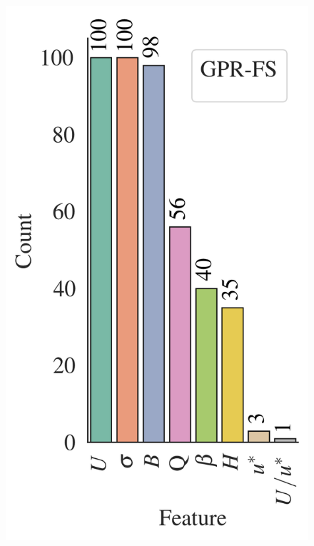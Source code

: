 \documentclass[a4paper,12pt, english]{article}
\begin{document}
\begin{figure}[!htb]
    \centering 
    \includegraphics[height=0.35\textheight]{./results/eml____300dpi_active_features_distribution_gpr_fs__count}

\end{figure}
\end{document}
